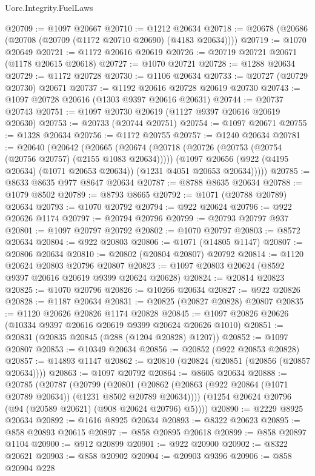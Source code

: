\begin{lexlean}{Uorc.Integrity.FuelLaws}
\begin{coremodule}
@20709 := @1097 @20667
@20710 := @1212 @20634
@20718 := @20678 (@20686 (@20708 (@20709 (@1172 @20710 @20690) (@4183 @20634))))
@20719 := @1070 @20649
@20721 := @1172 @20616 @20619
@20726 := @20719 @20721 @20671 (@1178 @20615 @20618)
@20727 := @1070 @20721
@20728 := @1288 @20634
@20729 := @1172 @20728
@20730 := @1106 @20634
@20733 := @20727 (@20729 @20730) @20671
@20737 := @1192 @20616 @20728 @20619 @20730
@20743 := @1097 @20728 @20616 (@1303 @9397 @20616 @20631)
@20744 := @20737 @20743
@20751 := @1097 @20730 @20619 (@1127 @9397 @20616 @20619 @20630)
@20753 := @20733 (@20744 @20751)
@20754 := @1097 @20671
@20755 := @1328 @20634
@20756 := @1172 @20755
@20757 := @1240 @20634
@20781 := @20640
    (@20642
      (@20665
        (@20674
          (@20718 (@20726 (@20753 (@20754 (@20756 @20757) (@2155 @1083 @20634)))))
          (@1097 @20656 (@922 (@4195 @20634) (@1071 @20653 @20634)) (@1231 @4051 @20653 @20634)))))
@20785 := @8633 @8635 @977 @8647 @20634
@20787 := @8788 @8635 @20634
@20788 := @1079 @8502
@20789 := @8793 @8665
@20792 := @1071 (@20788 @20789) @20634
@20793 := @1070 @20792
@20794 := @922 @20624
@20796 := @922 @20626 @1174
@20797 := @20794 @20796
@20799 := @20793 @20797 @937
@20801 := @1097 @20797 @20792
@20802 := @1070 @20797
@20803 := @8572 @20634
@20804 := @922 @20803
@20806 := @1071 (@14805 @1147)
@20807 := @20806 @20634
@20810 := @20802 (@20804 @20807) @20792
@20814 := @1120 @20624 @20803 @20796 @20807
@20823 := @1097 @20803 @20624 (@8592 @9397 @20616 @20619 @9399 @20624 @20628)
@20824 := @20814 @20823
@20825 := @1070 @20796
@20826 := @10266 @20634
@20827 := @922 @20826
@20828 := @1187 @20634
@20831 := @20825 (@20827 @20828) @20807
@20835 := @1120 @20626 @20826 @1174 @20828
@20845 := @1097 @20826 @20626 (@10334 @9397 @20616 @20619 @9399 @20624 @20626 @1010)
@20851 := @20831 (@20835 @20845 (@288 (@1204 @20828) @1207))
@20852 := @1097 @20807
@20853 := @10349 @20634
@20856 := @20852 (@922 @20853 @20828)
@20857 := @14893 @1147
@20862 := @20810 (@20824 (@20851 (@20856 (@20857 @20634))))
@20863 := @1097 @20792
@20864 := @8605 @20634
@20888 := @20785
    (@20787
      (@20799
        (@20801 (@20862 (@20863 (@922 @20864 (@1071 @20789 @20634)) (@1231 @8502 @20789 @20634))))
        (@1254 @20624 @20796 (@94 (@20589 @20621) (@908 @20624 @20796) @5))))
@20890 := @2229 @8925 @20634
@20892 := @1616 @8925 @20634
@20893 := @8322 @20623
@20895 := @858 @20893 @20615
@20897 := @858 @20895 @20618
@20899 := @858 @20897 @1104
@20900 := @912 @20899
@20901 := @922 @20900
@20902 := @8322 @20621
@20903 := @858 @20902
@20904 := @20903 @9396
@20906 := @858 @20904 @228

\end{coremodule}
\end{lexlean}
